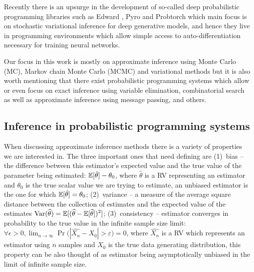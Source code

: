 \documentclass[12pt]{article}
\begin{document}
Recently there is an upsurge in the development of so-called deep probabilistic programming libraries such as Edward \citep{TranEtAl2016}, Pyro \citep{Pyro2018} and Probtorch \citep{Siddharth2017} which main focus is on stochastic variational inference for deep generative models, and hence they live in programming environments which allow simple access to auto-differentiation necessary for training neural networks.

Our focus in this work is mostly on approximate inference using Monte Carlo (MC), Markov chain Monte Carlo (MCMC) and variational methods but it is also worth mentioning that there exist probabilistic programming systems which allow or even focus on exact inference using variable elimination, combinatorial search as well as approximate inference using message passing, and others.




\subsection{Inference in probabilistic programming systems}
\label{sec:inference-prob-prog}

When discussing approximate inference methods there is a variety of properties we are interested in.
The three important ones that need defining are 
(1)~bias -- the difference between this estimator's expected value and the true value of the parameter being estimated: 
$\mathbb{E} [\hat{\theta}] - \theta_0$, 
where $\hat{\theta}$ is a RV representing an estimator and $\theta_0$ is the true scalar value we are trying to estimate,
an unbiased estimator is the one for which $\mathbb{E} [\hat{\theta}] = \theta_0$;
(2)~variance -- a measure of the average square distance between the collection of estimates and the expected value of the estimates
${\displaystyle \operatorname {Var} ({\widehat {\theta }})=\mathbb{E} [({\widehat {\theta }}-\mathbb{E} [{\widehat {\theta }}])^{2}]}$;
(3)~consistency -- estimator converges in probability to the true value in the infinite sample size limit: 
$\forall \epsilon>0, \lim _{n\to \infty}\Pr {\big (}|\hat{X_{n}}-X_0| > \varepsilon {\big )}=0$, 
where $\hat{X_n}$ is a RV which represents an estimator using $n$ samples and $X_0$ is the true data generating distribution,
this property can be also thought of as estimator being asymptotically unbiased in the limit of infinite sample size.
\end{document}
